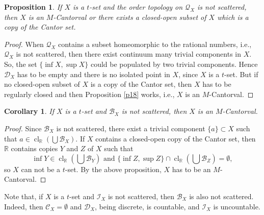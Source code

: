 \documentclass[12pt,a4paper,leqno]{amsart}
\newcommand{\cl}{\operatorname{cl}}
\newtheorem{pro}[thm]{Proposition}
\newtheorem{cor}[thm]{Corollary}
\theoremstyle{definition}
\begin{document}
\begin{pro}\label{p20}
 If  $X$ is a $ t $-set and the order topology on $\mathcal Q_X$  is not scattered, then  $X$ is  an $M$-Cantorval or there exists a  closed-open subset of $X$ which is a copy of the Cantor set. \end{pro}
\begin{proof} When $\mathcal Q_X$ contains a  subset homeomorphic to the rational numbers, i.e., $\mathcal Q_X$ is not scattered, then there exist  continuum many trivial components in $X$.  So, the set $\{\inf X, \sup X\}$ could be populated by two trivial components. Hence   $\mathcal D_X$ has to be  empty and   there is no isolated point in $X$, since $X$ is a $t$-set. But if  no  closed-open subset of $X$  is a copy of the Cantor set, then $X$ has to be regularly closed and then Proposition \ref{p18} works, i.e., $X$ is an $M$-Cantorval.
 \end{proof}

\begin{cor}\label{c21} If  $X$ is a $ t $-set and $\mathcal B_X$ is not scattered, then $X$ is an $M$-Cantorval. \end{cor}
\begin{proof} Since $\mathcal B_X$ is not scattered, there exist a trivial component $\{a\} \subset X$ such that $a \in \cl_\mathbb R(\bigcup \mathcal B_X)$.
 If $X$ contains a closed-open  copy of the Cantor set, then  $\mathbb R$ contains copies $Y$ and $Z$ of $X$ such that $$\textstyle  \inf Y \in \cl_\mathbb R (\bigcup \mathcal B_Y) \mbox{ and } \{\inf Z, \sup Z\} \cap \cl_\mathbb R (\bigcup \mathcal B_Z) = \emptyset, $$ so $X$ can  not be a $t$-set.  By the above proposition, $X$ has to be  an $M$-Cantorval. \end{proof}

Note that, if  $X$ is a $ t $-set and $\mathcal I_X$ is not scattered, then  $\mathcal B_X$ is also not scattered. Indeed, then $\mathcal C_X=\emptyset$ and $\mathcal D_X$, being  discrete, is countable, and $\mathcal I_X$ is uncountable.
\end{document}
